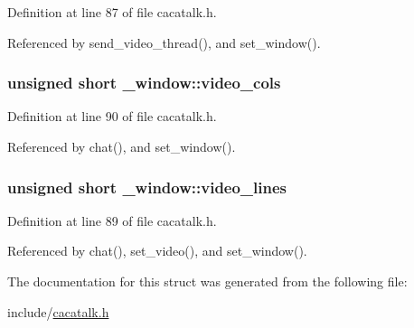 \-Definition at line 87 of file cacatalk.\-h.



\-Referenced by send\-\_\-video\-\_\-thread(), and set\-\_\-window().

\hypertarget{struct__window_a801a0717b1dd18a92878ab36a4176b42}{
\subsubsection[{video\-\_\-cols}]{\setlength{\rightskip}{0pt plus 5cm}unsigned short {\bf \-\_\-window\-::video\-\_\-cols}}}\label{struct__window_a801a0717b1dd18a92878ab36a4176b42}


\-Definition at line 90 of file cacatalk.\-h.



\-Referenced by chat(), and set\-\_\-window().

\hypertarget{struct__window_a9bd45de653040c0b3b9c725df5f88b2d}{
\subsubsection[{video\-\_\-lines}]{\setlength{\rightskip}{0pt plus 5cm}unsigned short {\bf \-\_\-window\-::video\-\_\-lines}}}\label{struct__window_a9bd45de653040c0b3b9c725df5f88b2d}


\-Definition at line 89 of file cacatalk.\-h.



\-Referenced by chat(), set\-\_\-video(), and set\-\_\-window().



\-The documentation for this struct was generated from the following file\-:\begin{DoxyCompactItemize}
\item 
include/\hyperlink{cacatalk_8h}{cacatalk.\-h}\end{DoxyCompactItemize}
